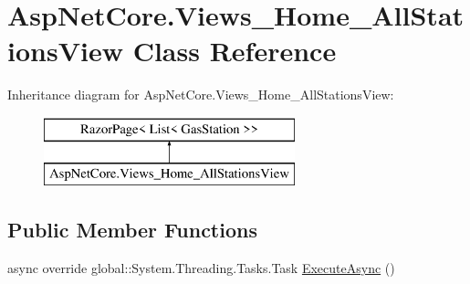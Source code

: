 \hypertarget{class_asp_net_core_1_1_views___home___all_stations_view}{}\section{Asp\+Net\+Core.\+Views\+\_\+\+Home\+\_\+\+All\+Stations\+View Class Reference}
\label{class_asp_net_core_1_1_views___home___all_stations_view}
Inheritance diagram for Asp\+Net\+Core.\+Views\+\_\+\+Home\+\_\+\+All\+Stations\+View\+:\begin{figure}[H]
\begin{center}
\leavevmode
\includegraphics[height=2.000000cm]{class_asp_net_core_1_1_views___home___all_stations_view}
\end{center}
\end{figure}
\subsection*{Public Member Functions}
\begin{DoxyCompactItemize}
\item 
async override global\+::\+System.\+Threading.\+Tasks.\+Task \mbox{\hyperlink{class_asp_net_core_1_1_views___home___all_stations_view_ab3f3345aead9b65284f82fb35baaa7a6}{Execute\+Async}} ()
\end{DoxyCompactItemize}
